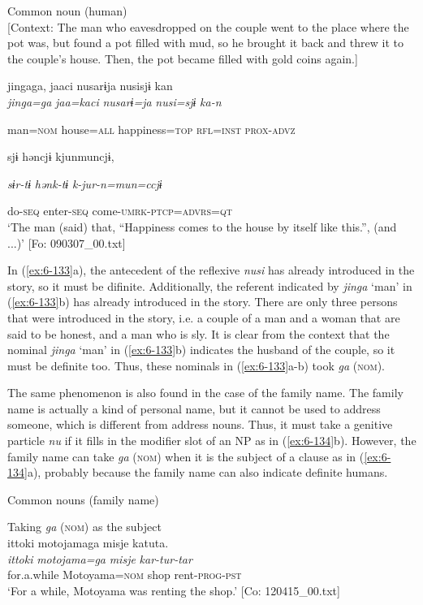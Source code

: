 \begin{table}
\begin{styleBeschriftung}
\ex Common noun (human)\\{}
[Context: The man who eavesdropped on the couple went to the place where the pot was, but found a pot filled with mud, so he brought it back and threw it to the couple’s house. Then, the pot became filled with gold coins again.]

{\TM}
\glll jingaga,  jaaci  nusarɨja  nusisjɨ  kan\\

      \textit{jinga=ga}  \textit{jaa=kaci}  \textit{nusarɨ=ja}  \textit{nusi=sjɨ}  \textit{ka-n}

      man=\textsc{nom}  house=\textsc{all}  happiness=\textsc{top}  \textsc{rfl}=\textsc{inst}  \textsc{prox}-\textsc{advz}

      sjɨ  həncjɨ  kjunmuncjɨ,

      \textit{sɨr-tɨ}  \textit{hənk-tɨ}  \textit{k-jur-n=mun=ccjɨ}

      do-\textsc{seq}  enter-\textsc{seq}  come-\textsc{umrk}-\textsc{ptcp}=\textsc{advrs}=\textsc{qt}\\
\glt ‘The man (said) that, “Happiness comes to the house by itself like this.”, (and ...)’ [Fo: 090307\_00.txt]
\z

In (\ref{ex:6-133}a), the antecedent of the reflexive \textit{nusi} has already introduced in the story, so it must be difinite. Additionally, the referent indicated by \textit{jinga} ‘man’ in (\ref{ex:6-133}b) has already introduced in the story. There are only three persons that were introduced in the story, i.e. a couple of a man and a woman that are said to be honest, and a man who is sly. It is clear from the context that the nominal \textit{jinga} ‘man’ in (\ref{ex:6-133}b) indicates the husband of the couple, so it must be definite too. Thus, these nominals in (\ref{ex:6-133}a-b) took \textit{ga} (\textsc{nom}).

The same phenomenon is also found in the case of the family name. The family name is actually a kind of personal name, but it cannot be used to address someone, which is different from address nouns. Thus, it must take a genitive particle \textit{nu} if it fills in the modifier slot of an NP as in (\ref{ex:6-134}b). However, the family name can take \textit{ga} (\textsc{nom}) when it is the subject of a clause as in (\ref{ex:6-134}a), probably because the family name can also indicate definite humans.

\ea\label{ex:6-134}
  Common nouns (family name)

 \ea Taking \textit{ga} (\textsc{nom}) as the subject\\
{\TM}
\glll  {\textbar}ittoki{\textbar}  motojamaga  misje  katuta.\\
\textit{ittoki}  \textit{motojama=ga}  \textit{misje}  \textit{kar-tur-tar}\\
for.a.while  Motoyama=\textsc{nom}  shop  rent-\textsc{prog}-\textsc{pst}\\
\glt ‘For a while, Motoyama was renting the shop.’ [Co: 120415\_00.txt]
\z


\end{styleBeschriftung}
\end{table}
